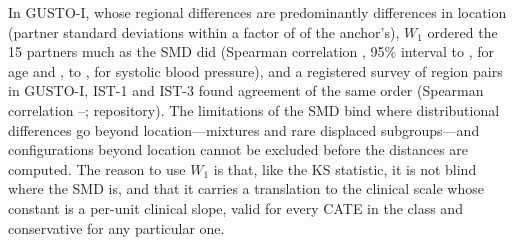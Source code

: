 \documentclass[AMA,Times1COL]{WileyNJDv5}
\begin{document}
In GUSTO-I, whose regional differences are predominantly differences in location (partner standard deviations within a factor of  of the anchor's), $W_1$ ordered the 15 partners much as the SMD did (Spearman correlation , 95\% interval  to , for age and ,  to , %
for systolic blood pressure), and a registered survey of region pairs in GUSTO-I, IST-1 and IST-3 found agreement of the same order (Spearman correlation --; repository).\cite{ist1_2000,ist3_2012} The limitations of the SMD bind where distributional differences go beyond location---mixtures and rare displaced subgroups---and configurations beyond location cannot be excluded before the distances are computed. The reason to use $W_1$ is that, like the KS statistic, it is not blind where the SMD is, and that it carries a translation to the clinical scale whose constant is a per-unit clinical slope, valid for every CATE in the class and conservative for any particular one.

\end{document}
